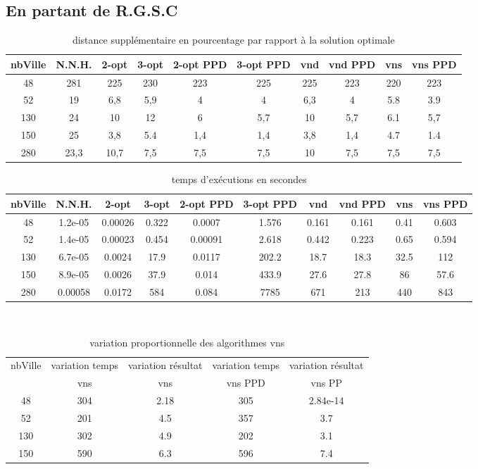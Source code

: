 \documentclass[12pt,a4paper]{article}
\begin{document}
\subsection{En partant de R.G.S.C}
\begin{table}[!h]
\centering
\begin{tabular}{|*{10}{c|}}
  \hline
  nbVille & N.N.H. & 2-opt & 3-opt & 2-opt PPD & 3-opt PPD & vnd & vnd PPD & vns & vns PPD \\
  \hline
  48 & 281 & 225 & 230 & 223 & 225 & 225 & 223 & 220 & 223 \\
  52 & 19 & 6,8 & 5,9 & 4 & 4 & 6,3 & 4 & 5.8 & 3.9 \\
  130 & 24 & 10 & 12 & 6 & 5,7 & 10 & 5,7 & 6.1 & 5,7 \\
  150 & 25 & 3,8 & 5.4 & 1,4 & 1,4 & 3,8 & 1,4 & 4.7 & 1.4 \\
  280 & 23,3 & 10,7 & 7,5 & 7,5 & 7,5 & 10 & 7,5 & 7,5 & 7,5 \\
  \hline
\end{tabular}
\caption{distance supplémentaire en pourcentage par rapport à la solution optimale}
\label{NNHpourcentageperf}
\end{table}

\begin{table}[!h]
\centering
\begin{tabular}{|*{10}{c|}}
  \hline
  nbVille & N.N.H. & 2-opt & 3-opt & 2-opt PPD & 3-opt PPD & vnd & vnd PPD & vns & vns PPD \\
  \hline
  48 & 1.2e-05 & 0.00026 & 0.322 & 0.0007 & 1.576 & 0.161 & 0.161 & 0.41 & 0.603 \\
  52 & 1.4e-05 & 0.00023 & 0.454 & 0.00091 & 2.618 & 0.442 & 0.223 & 0.65 & 0.594 \\
  130 & 6.7e-05 & 0.0024 & 17.9 & 0.0117 & 202.2 & 18.7 & 18.3 & 32.5 & 112 \\
  150 & 8.9e-05 & 0.0026 & 37.9 & 0.014 & 433.9 & 27.6 & 27.8 & 86 & 57.6 \\
  280 & 0.00058 & 0.0172 & 584 & 0.084 & 7785 & 671 & 213 & 440 & 843 \\ 
  \hline
\end{tabular}
\caption{temps d’exécutions en secondes}
\label{NNHtemps}
\end{table}
~\\
\begin{table}[!h]
\centering
\begin{tabular}{|*{5}{c|}}
  \hline
  nbVille & variation temps & variation résultat & variation temps & variation résultat \\
  ~ & vns & vns & vns PPD & vns PP \\
  \hline
  48 & 304 & 2.18 & 305 & 2.84e-14 \\ 
  52 & 201 & 4.5 & 357 & 3.7 \\
  130 & 302 & 4.9 & 202 & 3.1 \\
  150 & 590 & 6.3 & 596 & 7.4 \\
  \hline
\end{tabular}
\caption{variation proportionnelle des algorithmes vns}
\label{variationvnsNNH}
\end{table}
~\\
\end{document}
